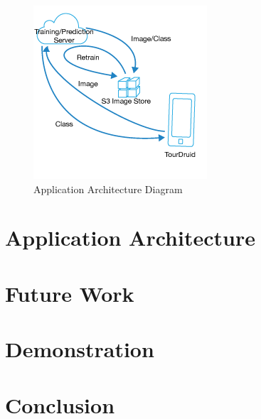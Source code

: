 \documentclass[twocolumn]{article}
\newcommand{\sectionfile}[3]{\section{#1} \label{sec:#2} }
\begin{document}
\begin{figure}
\includegraphics[width=\linewidth]{app_arch.png}

\caption{Application Architecture Diagram}
\label{overflow}

\end{figure}
\sectionfile{Application Architecture}{application_architecture}{application_architecture.tex}
\sectionfile{Future Work}{future_work}{future.tex}
\sectionfile{Demonstration}{demonstration}{demonstration.tex}
\sectionfile{Conclusion}{conclusion}{conclusion.tex}

\nocite{*}
{\small


}
\end{document}
